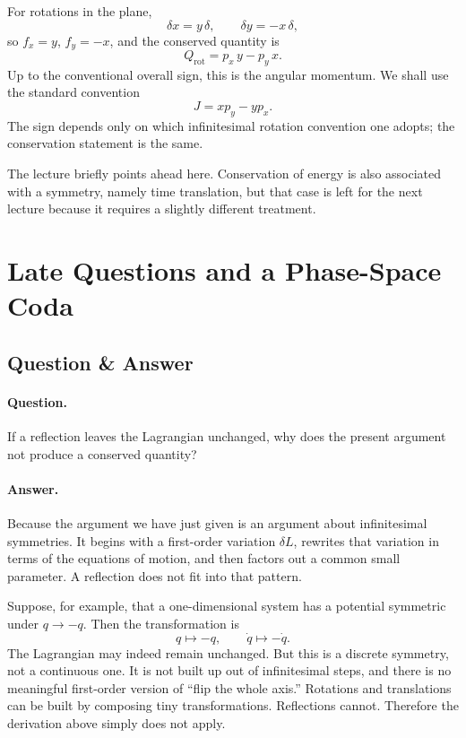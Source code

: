 For rotations in the plane,
\begin{equation}
\delta x = y\,\delta,
\qquad
\delta y = -x\,\delta,
\end{equation}
so \(f_x=y\), \(f_y=-x\), and the conserved quantity is
\begin{equation}
Q_{\mathrm{rot}}=p_x\,y-p_y\,x.
\end{equation}
Up to the conventional overall sign, this is the angular momentum. We shall use the standard convention
\begin{equation}
J=xp_y-yp_x.
\end{equation}
The sign depends only on which infinitesimal rotation convention one adopts; the conservation statement is the same.

The lecture briefly points ahead here. Conservation of energy is also associated with a symmetry, namely time translation, but that case is left for the next lecture because it requires a slightly different treatment.

\section{Late Questions and a Phase-Space Coda}

\subsection{Question \& Answer}

\paragraph{Question.} If a reflection leaves the Lagrangian unchanged, why does the present argument not produce a conserved quantity?

\paragraph{Answer.} Because the argument we have just given is an argument about infinitesimal symmetries. It begins with a first-order variation \(\delta L\), rewrites that variation in terms of the equations of motion, and then factors out a common small parameter. A reflection does not fit into that pattern.

Suppose, for example, that a one-dimensional system has a potential symmetric under \(q\to -q\). Then the transformation is
\begin{equation}
q\mapsto -q,
\qquad
\dot q\mapsto -\dot q.
\end{equation}
The Lagrangian may indeed remain unchanged. But this is a discrete symmetry, not a continuous one. It is not built up out of infinitesimal steps, and there is no meaningful first-order version of ``flip the whole axis.'' Rotations and translations can be built by composing tiny transformations. Reflections cannot. Therefore the derivation above simply does not apply.

